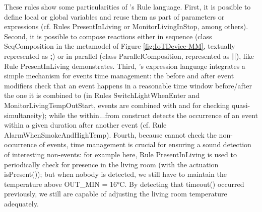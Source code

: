 These rules show some particularities of \IOTDSL's Rule language. First, it is possible to define local or global variables and reuse them as part of parameters or expressions (cf. Rules \textsf{PresentInLiving} or \textsf{MonitorLivingInStop}, among others). Second, it is possible to compose reactions either in sequence (class \textsf{SeqComposition} in the metamodel of Figure \ref{fig:IoTDevice-MM}, textually represented as \textsf{\textbf{;}}) or in parallel (class \textsf{ParallelComposition}, represented as \textsf{\textbf{||}}), like Rule \textsf{PresentInLiving} demonstrates. Third, \IOTDSL's expression language integrates a simple mechanism for events time management: the \textsf{before} and \textsf{after} event modifiers check that an event happens in a reasonable time window before/after the one it is combined to (in Rules \textsf{SwitchLightWhenEnter} and \textsf{MonitorLivingTempOutStart}, events are combined with \textsf{and} for checking quasi-simultaneity); while the \textsf{within...from} construct detects the occurrence of an event within a given duration after another event (cf. Rule \textsf{AlarmWhenSmokeAndHighTemp}). Fourth, because \IOTDSL cannot check the non-occurrence of events, time management is crucial for ensuring a sound detection of interesting non-events: for example here, Rule \textsf{PresentInLiving} is used to periodically check for presence in the living room (with the actuation \textsf{isPresent()}); but when nobody is detected, we still have to maintain the temperature above \textsf{OUT\_MIN} = 16°C. By detecting that \textsf{timeout()} occurred previously, we still are capable of adjusting the living room temperature adequately.
